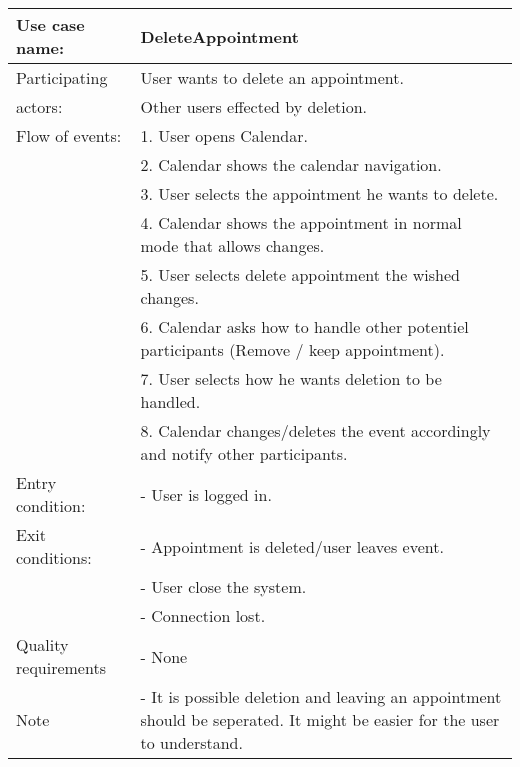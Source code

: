 {\tabulinesep=1.2mm
\begin{tabu}{ | p{3cm} | p{13cm} |}
    \hline
    Use case name: 			& 		DeleteAppointment\\ \hline
    Participating  			& 		User wants to delete an appointment. \\
    actors:					&		Other users effected by deletion.\\ \hline
    Flow of events: 		& 		1. User opens Calendar. \\
							&		2. Calendar shows the calendar navigation.\\
							&		3. User selects the appointment he wants to delete.\\
							&		4. Calendar shows the appointment in normal mode that allows changes.\\
							&		5. User selects delete appointment the wished changes.\\
							&		6. Calendar asks how to handle other potentiel participants (Remove / keep appointment).\\ 
							&		7. User selects how he wants deletion to be handled.\\ 
							&		8. Calendar changes/deletes the event accordingly and notify other participants.\\\hline
    Entry condition: 		& 		- User is logged in.  \\ \hline
	Exit conditions: 		&		- Appointment is deleted/user leaves event.\\
							&		- User close the system.\\
							&		- Connection lost.\\\hline
	Quality requirements	&	 	- None \\\hline
	Note					&		- It is possible deletion and leaving an appointment should be seperated. It might be easier for the user to understand.\\\hline
\end{tabu}
}